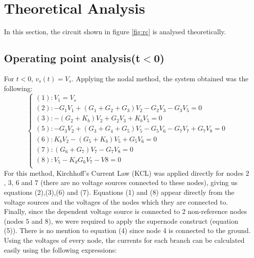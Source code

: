 \newpage
\section{Theoretical Analysis}
\label{sec:analysis}

In this section, the circuit shown in figure \ref{fig:rc} is analysed
theoretically.


\subsection{Operating point analysis(t$<$0)}
\label{subsec:analysis2}

For $t<0$, $v_{s}\left(t\right)=V_{s}$.
Applying the nodal method, the system obtained was the following:
\begin{equation}
  \begin{cases}
    \left(1\right): V_{1}=V_{s}                                                                        \\
    \left(2\right): -G_{1}V_{1}+\left(G_{1}+G_{2}+G_{3}\right)V_{2}-G_{2}V_{3}-G_{3}V_{5}=0            \\
    \left(3\right): -\left(G_{2}+K_{b}\right)V_{2}+G_{2}V_{3}+K_{b}V_{5}=0                             \\
    \left(5\right): -G_{3}V_{2}+\left(G_{3}+G_{4}+G_{5}\right)V_{5}-G_{5}V_{6}-G_{7}V_{7}+G_{7}V_{8}=0 \\
    \left(6\right): K_{b}V_{2}-\left(G_{5}+K_{b}\right)V_{5} +G_{5}V_{6}=0                             \\
    \left(7\right): \left(G_{6}+G_{7}\right)V_{7}-G_{7}V_{8}=0                                         \\
    \left(8\right): V_{5}-K_{d}G_{6}V_{7}-V{8}=0                                                       \\
  \end{cases}
\end{equation}
For this method, Kirchhoff's Current Law (KCL) was applied directly for nodes $2$, $3$, $6$ and $7$ (there are no voltage sources connected to these nodes), giving us equations (2),(3),(6) and (7). Equations (1) and (8) appear directly from the voltage sources  and the voltages of the nodes which they are connected to. Finally, since the dependent voltage source is connected to 2 non-reference nodes (nodes $5$ and $8$), we were required to apply the supernode construct (equation (5)). There is no mention to equation (4) since node 4 is connected to the ground.
Using the voltages of every node, the currents for each branch can be
 calculated easily using the following expressions:

